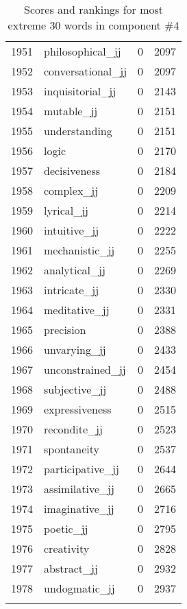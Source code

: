 \begin{longtable}[!htbp]{| rlr@{.}l |}
    1951 & philosophical\_jj & 0 & 2097 \\
    1952 & conversational\_jj & 0 & 2097 \\
    1953 & inquisitorial\_jj & 0 & 2143 \\
    1954 & mutable\_jj & 0 & 2151 \\
    1955 & understanding & 0 & 2151 \\
    1956 & logic & 0 & 2170 \\
    1957 & decisiveness & 0 & 2184 \\
    1958 & complex\_jj & 0 & 2209 \\
    1959 & lyrical\_jj & 0 & 2214 \\
    1960 & intuitive\_jj & 0 & 2222 \\
    1961 & mechanistic\_jj & 0 & 2255 \\
    1962 & analytical\_jj & 0 & 2269 \\
    1963 & intricate\_jj & 0 & 2330 \\
    1964 & meditative\_jj & 0 & 2331 \\
    1965 & precision & 0 & 2388 \\
    1966 & unvarying\_jj & 0 & 2433 \\
    1967 & unconstrained\_jj & 0 & 2454 \\
    1968 & subjective\_jj & 0 & 2488 \\
    1969 & expressiveness & 0 & 2515 \\
    1970 & recondite\_jj & 0 & 2523 \\
    1971 & spontaneity & 0 & 2537 \\
    1972 & participative\_jj & 0 & 2644 \\
    1973 & assimilative\_jj & 0 & 2665 \\
    1974 & imaginative\_jj & 0 & 2716 \\
    1975 & poetic\_jj & 0 & 2795 \\
    1976 & creativity & 0 & 2828 \\
    1977 & abstract\_jj & 0 & 2932 \\
    1978 & undogmatic\_jj & 0 & 2937 \\
    \hline
    \caption{Scores and rankings for most extreme 30 words in component \#4} \\
\end{longtable}
